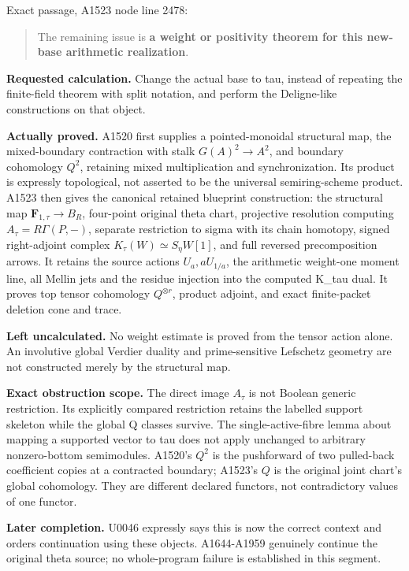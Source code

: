 Exact passage, A1523 node
\protect{} line 2478:

\begin{quote}
The remaining issue is \textbf{a weight or positivity theorem for this
new-base arithmetic realization}.
\end{quote}

\textbf{Requested calculation.} Change the actual base to tau, instead
of repeating the finite-field theorem with split notation, and perform
the Deligne-like constructions on that object.

\textbf{Actually proved.} A1520 first supplies a pointed-monoidal
structural map, the mixed-boundary contraction with stalk
\(G(A)^2\to A^2\), and boundary cohomology \(Q^2\), retaining mixed
multiplication and synchronization. Its product is expressly
topological, not asserted to be the universal semiring-scheme product.
A1523 then gives the canonical retained blueprint construction: the
structural map \(\mathbf F_{1,\tau}\to B_R\), four-point original theta
chart, projective resolution computing \(A_\tau=R\Gamma(P,-)\), separate
restriction to sigma with its chain homotopy, signed right-adjoint
complex \(K_\tau(W)\simeq S_\eta W[1]\), and full reversed
precomposition arrows. It retains the source actions \(U_a,aU_{1/a}\),
the arithmetic weight-one moment line, all Mellin jets and the residue
injection into the computed K\_tau dual. It proves top tensor cohomology
\(Q^{\otimes r}\), product adjoint, and exact finite-packet deletion
cone and trace.

\textbf{Left uncalculated.} No weight estimate is proved from the tensor
action alone. An involutive global Verdier duality and prime-sensitive
Lefschetz geometry are not constructed merely by the structural map.

\textbf{Exact obstruction scope.} The direct image \(A_\tau\) is not
Boolean generic restriction. Its explicitly compared restriction retains
the labelled support skeleton while the global Q classes survive. The
single-active-fibre lemma about mapping a supported vector to tau does
not apply unchanged to arbitrary nonzero-bottom semimodules. A1520's
\(Q^2\) is the pushforward of two pulled-back coefficient copies at a
contracted boundary; A1523's \(Q\) is the original joint chart's global
cohomology. They are different declared functors, not contradictory
values of one functor.

\textbf{Later completion.} U0046 expressly says this is now the correct
context and orders continuation using these objects. A1644-A1959
genuinely continue the original theta source; no whole-program failure
is established in this segment.

